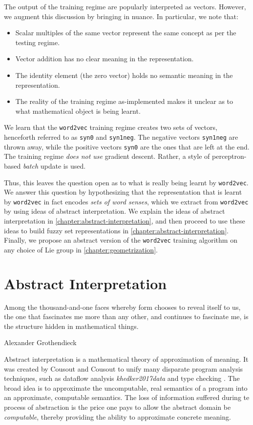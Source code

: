 \documentclass[11pt]{book}
\begin{document}
The output of the training regime are popularly interpreted as vectors.
However, we augment this discussion by bringing in nuance. In particular, we
note that:
\begin{itemize}
\item Scalar multiples of the same vector represent the same concept as per the testing regime.
\item Vector addition has no clear meaning in the representation.
\item The identity element (the zero vector) holds no semantic meaning in the representation.
\item The reality of the training regime as-implemented makes it unclear as to
      what mathematical object is being learnt.
\end{itemize}


We learn that the \texttt{word2vec} training regime creates two sets of vectors, henceforth
referred to as \texttt{syn0} and \texttt{syn1neg}. The negative vectors
\texttt{syn1neg} are thrown away, while the positive vectors \texttt{syn0} are
the ones that are left at the end. The training regime \emph{does not use}
gradient descent. Rather, a style of perceptron-based \textit{batch} update is used.

Thus,
this leaves the question open as to what is really being learnt by
\texttt{word2vec}. We answer this question by hypothesizing that the
representation that is learnt by \texttt{word2vec} in fact encodes \emph{sets
of word senses}, which we extract from \texttt{word2vec} by using ideas of
abstract interpretation. We explain the ideas of abstract interpretation in
\autoref{chapter:abstract-interpretation}, and then proceed to use these ideas
to build fuzzy set representations in
\autoref{chapter:abstract-interpretation}. Finally, we propose an abstract
version of the \texttt{word2vec} training algorithm on any choice of Lie group
in \autoref{chapter:geometrization}.

\section{Abstract Interpretation}
\label{chapter:abstract-interpretation}
\epigraph{Among the thousand-and-one faces whereby form chooses to reveal itself to us, the one that fascinates me more than any other, and continues to fascinate me, is the structure hidden in mathematical things.}{Alexander Grothendieck}

Abstract interpretation is a mathematical theory of approximation of meaning.
It was created by Cousout and Cousout to unify many disparate program analysis
techniques, such as dataflow analysis \emph{khedker2017data} and type checking
\cite{file199abstract}. The broad idea is to approximate the uncomputable,
real semantics of a program into an approximate, computable semantics.
The loss of information suffered during te process of abstraction is the price
one pays to allow the abstract domain be \emph{computable}, thereby providing
the ability to approximate concrete meaning. 
\end{document}
